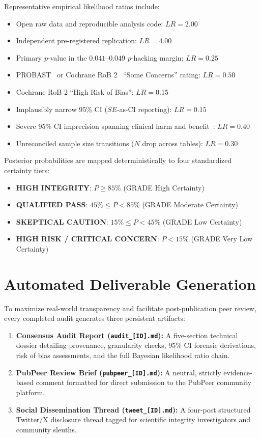 \documentclass[11pt,a4paper]{article}
\begin{document}
Representative empirical likelihood ratios include:
\begin{itemize}
    \item Open raw data and reproducible analysis code: $LR = 2.00$
    \item Independent pre-registered replication: $LR = 4.00$
    \item Primary $p$-value in the $0.041$--$0.049$ $p$-hacking margin: $LR = 0.25$
    \item PROBAST~\cite{wolff2019probast} or Cochrane RoB 2~\cite{sterne2019rob2} ``Some Concerns'' rating: $LR = 0.50$
    \item Cochrane RoB 2 ``High Risk of Bias'': $LR = 0.15$
    \item Implausibly narrow 95\% CI ($SE$-as-CI reporting): $LR = 0.15$
    \item Severe 95\% CI imprecision spanning clinical harm and benefit~\cite{guyatt2011grade}: $LR = 0.40$
    \item Unreconciled sample size transitions ($N$ drop across tables): $LR = 0.30$
\end{itemize}

Posterior probabilities are mapped deterministically to four standardized certainty tiers:
\begin{itemize}
    \item \textbf{HIGH INTEGRITY}: $P \ge 85\%$ (GRADE High Certainty)
    \item \textbf{QUALIFIED PASS}: $45\% \le P < 85\%$ (GRADE Moderate Certainty)
    \item \textbf{SKEPTICAL CAUTION}: $15\% \le P < 45\%$ (GRADE Low Certainty)
    \item \textbf{HIGH RISK / CRITICAL CONCERN}: $P < 15\%$ (GRADE Very Low Certainty)
\end{itemize}

\section{Automated Deliverable Generation}
To maximize real-world transparency and facilitate post-publication peer review, every completed audit generates three persistent artifacts:
\begin{enumerate}
    \item \textbf{Consensus Audit Report (\texttt{audit\_[ID].md}):} A five-section technical dossier detailing provenance, granularity checks, 95\% CI forensic derivations, risk of bias assessments, and the full Bayesian likelihood ratio chain.
    \item \textbf{PubPeer Review Brief (\texttt{pubpeer\_[ID].md}):} A neutral, strictly evidence-based comment formatted for direct submission to the PubPeer community platform.
    \item \textbf{Social Dissemination Thread (\texttt{tweet\_[ID].md}):} A four-post structured Twitter/X disclosure thread tagged for scientific integrity investigators and community sleuths.
\end{enumerate}
\end{document}
